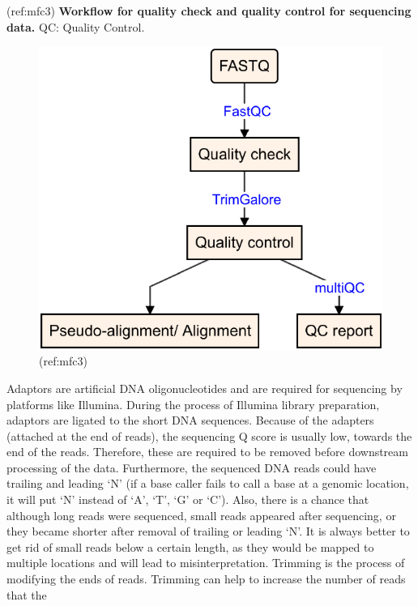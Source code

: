 \documentclass[12pt,twoside]{reedthesis}
\begin{document}
(ref:mfc3)
\textbf{Workflow for quality check and quality control for sequencing data.}
QC: Quality Control.
\begin{figure}[htbp]

{\centering \includegraphics{thesis_files/figure-latex/mf3-1} 

}

\caption[Workflow for quality check and quality control for sequencing data]{(ref:mfc3)}\label{fig:mf3}
\end{figure}
Adaptors are artificial DNA oligonucleotides and are required for
sequencing by platforms like Illumina. During the process of Illumina
library preparation, adaptors are ligated to the short DNA sequences.
Because of the adapters (attached at the end of reads), the sequencing Q
score is usually low, towards the end of the reads. Therefore, these are
required to be removed before downstream processing of the data.
Furthermore, the sequenced DNA reads could have trailing and leading `N'
(if a base caller fails to call a base at a genomic location, it will
put `N' instead of `A', `T', `G' or `C'). Also, there is a chance that
although long reads were sequenced, small reads appeared after
sequencing, or they became shorter after removal of trailing or leading
`N'. It is always better to get rid of small reads below a certain
length, as they would be mapped to multiple locations and will lead to
misinterpretation. Trimming is the process of modifying the ends of
reads. Trimming can help to increase the number of reads that the
\end{document}
